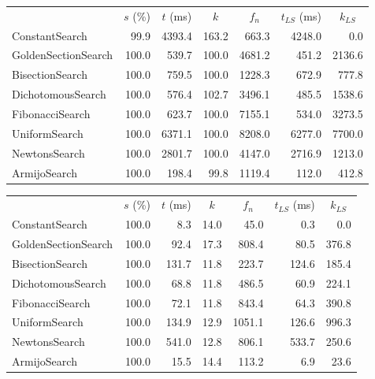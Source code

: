 \documentclass[a4paper,english,titlepage,12pt]{article}
\begin{document}
\begin{center}
\label{tab:performance_results_NE_CGM}
\begin{tabular}{|l|r|r|r|r|r|r|}
\hline
\rowcolor{gray!25}
\multicolumn{1}{|c|}{Line Search Name} & \multicolumn{1}{c|}{$s$ (\%)} & \multicolumn{1}{c|}{$t$ (ms)} & \multicolumn{1}{c|}{$k$} & \multicolumn{1}{c|}{$f_n$} & \multicolumn{1}{c|}{$t_{LS}$ (ms)} & \multicolumn{1}{c|}{$k_{LS}$} \\
ConstantSearch & 99.9 & 4393.4 & 163.2 & 663.3 & 4248.0 & 0.0 \\
GoldenSectionSearch & 100.0 & 539.7 & 100.0 & 4681.2 & 451.2 & 2136.6 \\
BisectionSearch & 100.0 & 759.5 & 100.0 & 1228.3 & 672.9 & 777.8 \\
DichotomousSearch & 100.0 & 576.4 & 102.7 & 3496.1 & 485.5 & 1538.6 \\
FibonacciSearch & 100.0 & 623.7 & 100.0 & 7155.1 & 534.0 & 3273.5 \\
UniformSearch & 100.0 & 6371.1 & 100.0 & 8208.0 & 6277.0 & 7700.0 \\
NewtonsSearch & 100.0 & 2801.7 & 100.0 & 4147.0 & 2716.9 & 1213.0 \\
ArmijoSearch & 100.0 & 198.4 & 99.8 & 1119.4 & 112.0 & 412.8 \\
\hline
\end{tabular}
\end{center}

\begin{center}
\label{tab:performance_results_NE_HBM}
\begin{tabular}{|l|r|r|r|r|r|r|}
\hline
\rowcolor{gray!25}
\multicolumn{1}{|c|}{Line Search Name} & \multicolumn{1}{c|}{$s$ (\%)} & \multicolumn{1}{c|}{$t$ (ms)} & \multicolumn{1}{c|}{$k$} & \multicolumn{1}{c|}{$f_n$} & \multicolumn{1}{c|}{$t_{LS}$ (ms)} & \multicolumn{1}{c|}{$k_{LS}$} \\
ConstantSearch & 100.0 & 8.3 & 14.0 & 45.0 & 0.3 & 0.0 \\
GoldenSectionSearch & 100.0 & 92.4 & 17.3 & 808.4 & 80.5 & 376.8 \\
BisectionSearch & 100.0 & 131.7 & 11.8 & 223.7 & 124.6 & 185.4 \\
DichotomousSearch & 100.0 & 68.8 & 11.8 & 486.5 & 60.9 & 224.1 \\
FibonacciSearch & 100.0 & 72.1 & 11.8 & 843.4 & 64.3 & 390.8 \\
UniformSearch & 100.0 & 134.9 & 12.9 & 1051.1 & 126.6 & 996.3 \\
NewtonsSearch & 100.0 & 541.0 & 12.8 & 806.1 & 533.7 & 250.6 \\
ArmijoSearch & 100.0 & 15.5 & 14.4 & 113.2 & 6.9 & 23.6 \\
\hline
\end{tabular}
\end{center}
\end{document}
